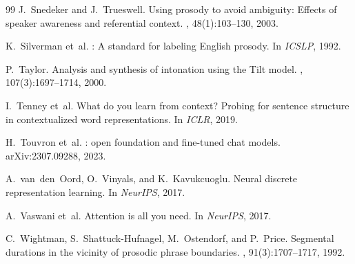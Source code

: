 \documentclass[11pt,letterpaper]{article}
\begin{document}
\begin{thebibliography}{99}
J.~Snedeker and J.~Trueswell.
\newblock Using prosody to avoid ambiguity: Effects of speaker awareness and referential context.
, 48(1):103--130, 2003.

K.~Silverman et~al.
: A standard for labeling {English} prosody.
\newblock In {\em ICSLP}, 1992.

P.~Taylor.
\newblock Analysis and synthesis of intonation using the {Tilt} model.
, 107(3):1697--1714, 2000.

I.~Tenney et~al.
\newblock What do you learn from context? Probing for sentence structure in contextualized word representations.
\newblock In {\em ICLR}, 2019.

H.~Touvron et~al.
: open foundation and fine-tuned chat models.
\newblock arXiv:2307.09288, 2023.

A.~van~den~Oord, O.~Vinyals, and K.~Kavukcuoglu.
\newblock Neural discrete representation learning.
\newblock In {\em NeurIPS}, 2017.

A.~Vaswani et~al.
\newblock Attention is all you need.
\newblock In {\em NeurIPS}, 2017.

C.~Wightman, S.~Shattuck-Hufnagel, M.~Ostendorf, and P.~Price.
\newblock Segmental durations in the vicinity of prosodic phrase boundaries.
, 91(3):1707--1717, 1992.

\end{thebibliography}
\end{document}

